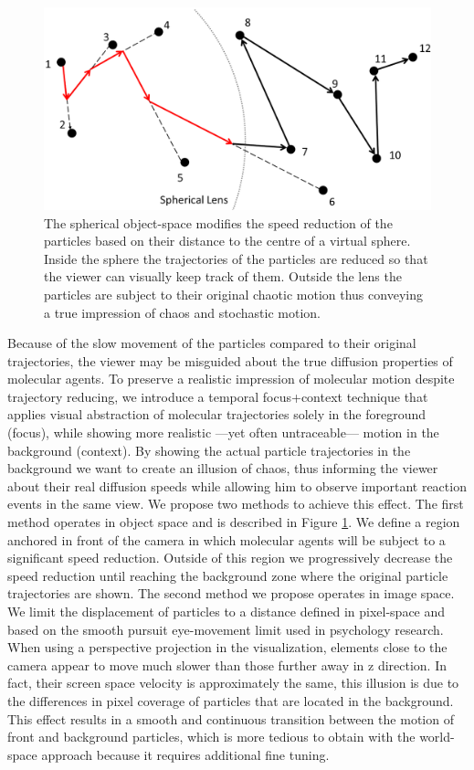 \begin{figure}
\centering
\includegraphics[width=0.5\linewidth]{graphics/SphericalLens}
\caption{The spherical object-space modifies the speed reduction of the particles based on their distance to the centre of a virtual sphere. Inside the sphere the trajectories of the particles are reduced so that the viewer can visually keep track of them. Outside the lens the particles are subject to their original chaotic motion thus conveying a true impression of chaos and stochastic motion.}
\label{fig:sphericallens}
\end{figure}

Because of the slow movement of the particles compared to their original trajectories, the viewer may be misguided about the true diffusion properties of molecular agents.
To preserve a realistic impression of molecular motion despite trajectory reducing, we introduce a temporal focus+context technique that applies visual abstraction of molecular trajectories solely in the foreground (focus), while showing more realistic ---yet often untraceable--- motion in the background (context).
By showing the actual particle trajectories in the background we want to create an illusion of chaos, thus informing the viewer about their real diffusion speeds while allowing him to observe important reaction events in the same view.
We propose two methods to achieve this effect.
The first method operates in object space and is described in Figure \ref{fig:sphericallens}.
We define a region anchored in front of the camera in which molecular agents will be subject to a significant speed reduction.
Outside of this region we progressively decrease the speed reduction until reaching the background zone where the original particle trajectories are shown.
The second method we propose operates in image space.
We limit the displacement of particles to a distance defined in pixel-space and based on the smooth pursuit eye-movement limit used in psychology research.
When using a perspective projection in the visualization, elements close to the camera appear to move much slower than those further away in z direction. 
In fact, their screen space velocity is approximately the same, this illusion is due to the differences in pixel coverage of particles that are located in the background.
This effect results in a smooth and continuous transition between the motion of front and background particles, which is more tedious to obtain with the world-space approach because it requires additional fine tuning.

